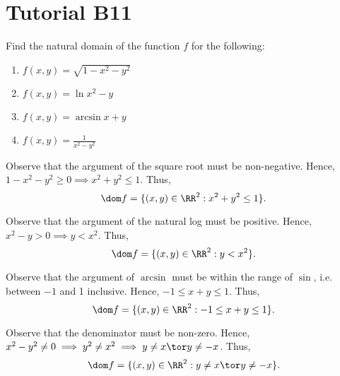 \section{Tutorial B11}

\begin{problem}
    Find the natural domain of the function $f$ for the following:
    \begin{enumerate}
        \item $f(x, y) = \sqrt{1 - x^2 - y^2}$
        \item $f(x, y) = \ln{x^2 - y}$
        \item $f(x, y) = \arcsin{x + y}$
        \item $f(x, y) = \frac1{x^2 - y^2}$
    \end{enumerate}
\end{problem}
\begin{solution}
    \begin{ppart}
        Observe that the argument of the square root must be non-negative. Hence, $1 - x^2 - y^2 \geq 0 \implies x^2 + y^2 \leq 1$. Thus, \[\dom f = \{ (x, y) \in \RR^2 : x^2 + y^2 \leq 1\}.\]
    \end{ppart}
    \begin{ppart}
        Observe that the argument of the natural log must be positive. Hence, $x^2 - y > 0 \implies y < x^2$. Thus, \[\dom f = \{(x, y) \in \RR^2 : y < x^2\}.\]
    \end{ppart}
    \begin{ppart}
        Observe that the argument of $\arcsin$ must be within the range of $\sin$, i.e. between $-1$ and 1 inclusive. Hence, $-1 \leq x + y \leq 1$. Thus, \[\dom f = \{(x, y) \in \RR^2 : -1 \leq x + y \leq 1\}.\]
    \end{ppart}
    \begin{ppart}
        Observe that the denominator must be non-zero. Hence, $x^2 - y^2 \neq 0 \implies y^2 \neq x^2 \implies y \neq x \tor y \neq -x$. Thus, \[\dom f = \{(x, y) \in \RR^2 : y \neq x \tor y \neq -x\}.\]
    \end{ppart}
\end{solution}

